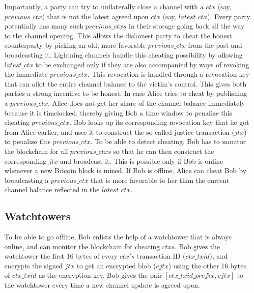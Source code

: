 Importantly, a party can try to unilaterally close a channel with a $\mathit{ctx}$ (say, $\mathit{previous\_ctx}$) that is not the latest agreed upon $\mathit{ctx}$ (say, $\mathit{latest\_ctx}$). Every party potentially has many such $\mathit{previous\_ctxs}$ in their storage going back all the way to the channel opening. This allows the dishonest party to cheat the honest counterparty by picking an old, more favorable $\mathit{previous\_ctx}$ from the past and broadcasting it. Lightning channels handle this cheating possibility by allowing $\mathit{latest\_ctx}$ to be exchanged only if they are also accompanied by ways of revoking the immediate $\mathit{previous\_ctx}$. This revocation is handled through a revocation key that can allot the entire channel balance to the victim's control. This gives both parties a strong incentive to be honest. In case Alice tries to cheat by publishing a $\mathit{previous\_ctx}$, Alice does not get her share of the channel balance immediately because it is timelocked, thereby giving Bob a time window to penalize this cheating $\mathit{previous\_ctx}$. Bob looks up its corresponding revocation key that he got from Alice earlier, and uses it to construct the so-called justice transaction ($\mathit{jtx}$) to penalize this $\mathit{previous\_ctx}$. To be able to detect cheating, Bob has to monitor the blockchain for all $\mathit{previous\_ctxs}$ so that he can then construct the corresponding $\mathit{jtx}$ and broadcast it. This is possible only if Bob is online whenever a new Bitcoin block is mined. If Bob is offline, Alice can cheat Bob by broadcasting a $\mathit{previous\_ctx}$ that is more favorable to her than the current channel balance reflected in the $\mathit{latest\_ctx}$. 

\subsection{Watchtowers}

To be able to go offline, Bob enlists the help of a watchtower that is always online, and can monitor the blockchain for cheating $\mathit{ctxs}$. Bob gives the watchtower the first 16 bytes of every $\mathit{ctx's}$ transaction ID ($\mathit{ctx\_txid}$), and encrypts the signed $\mathit{jtx}$ to get an encrypted blob ($\mathit{ejtx}$) using the other 16 bytes of $\mathit{ctx\_txid}$ as the encryption key. Bob gives the pair $\mathit{[ctx\_txid\_prefix, ejtx]}$ to the watchtower every time a new channel update is agreed upon. 


